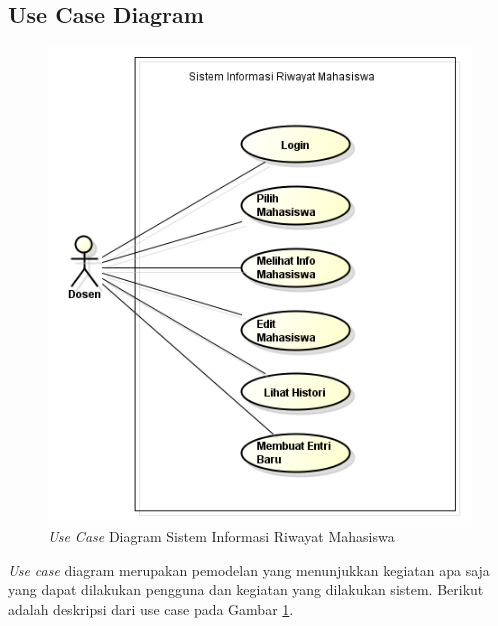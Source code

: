 \subsection{Use Case Diagram}
\begin{figure}[ht]
\centering
\includegraphics[scale=0.8]{Gambar/usecase.png}
\caption[{\it Use Case} Diagram Sistem Informasi Riwayat Mahasiswa]{{\it Use
Case} Diagram Sistem Informasi Riwayat Mahasiswa}
\label{fig:usecase}
\end{figure}

{\it Use case} diagram merupakan pemodelan yang menunjukkan kegiatan apa saja
yang dapat dilakukan pengguna dan kegiatan yang dilakukan sistem. Berikut adalah
deskripsi dari use case pada Gambar \ref{fig:usecase}.

